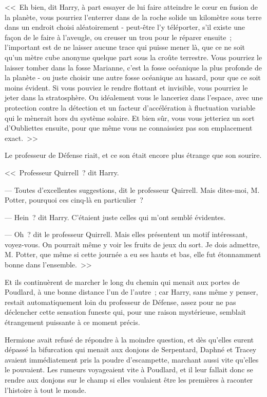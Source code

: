 <<~Eh bien, dit Harry, à part essayer de lui faire atteindre le cœur en fusion de la planète, vous pourriez l'enterrer dans de la roche solide un kilomètre sous terre dans un endroit choisi aléatoirement - peut-être l'y téléporter, s'il existe une façon de le faire à l'aveugle, ou creuser un trou pour le réparer ensuite~; l'important est de ne laisser aucune trace qui puisse mener là, que ce ne soit qu'un mètre cube anonyme quelque part sous la croûte terrestre. Vous pourriez le laisser tomber dans la fosse Marianne, c'est la fosse océanique la plus profonde de la planète - ou juste choisir une autre fosse océanique au hasard, pour que ce soit moins évident. Si vous pouviez le rendre flottant et invisible, vous pourriez le jeter dans la stratosphère. Ou idéalement vous le lanceriez dans l'espace, avec une protection contre la détection et un facteur d'accélération à fluctuation variable qui le mènerait hors du système solaire. Et bien sûr, vous vous jetteriez un sort d'Oubliettes ensuite, pour que même vous ne connaissiez pas son emplacement exact.~>>

Le professeur de Défense riait, et ce son était encore plus étrange que son sourire.

<<~Professeur Quirrell~? dit Harry.

--- Toutes d'excellentes suggestions, dit le professeur Quirrell. Mais dites-moi, M. Potter, pourquoi ces cinq-là en particulier~?

--- Hein~? dit Harry. C'étaient juste celles qui m'ont semblé évidentes.

--- Oh~? dit le professeur Quirrell. Mais elles présentent un motif intéressant, voyez-vous. On pourrait même y voir les fruits de jeux du sort. Je dois admettre, M. Potter, que même si cette journée a eu ses hauts et bas, elle fut étonnamment bonne dans l'ensemble.~>>

Et ils continuèrent de marcher le long du chemin qui menait aux portes de Poudlard, à une bonne distance l'un de l'autre~; car Harry, sans même y penser, restait automatiquement loin du professeur de Défense, assez pour ne pas déclencher cette sensation funeste qui, pour une raison mystérieuse, semblait étrangement puissante à ce moment précis.


Hermione avait refusé de répondre à la moindre question, et dès qu'elles eurent dépassé la bifurcation qui menait aux donjons de Serpentard, Daphné et Tracey avaient immédiatement pris la poudre d'escampette, marchant aussi vite qu'elles le pouvaient. Les rumeurs voyageaient vite à Poudlard, et il leur fallait donc se rendre aux donjons sur le champ si elles voulaient être les premières à raconter l'histoire à tout le monde.

